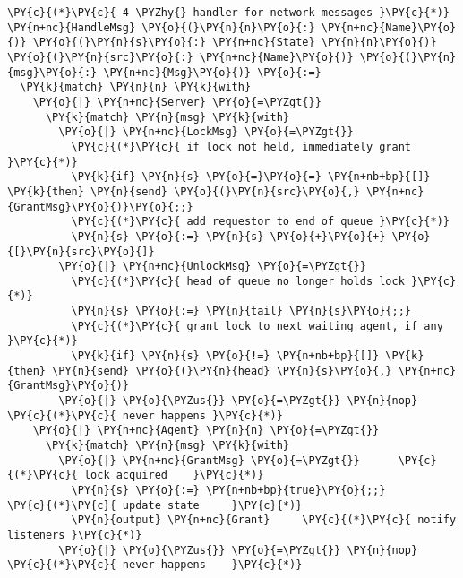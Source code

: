 \begin{Verbatim}[commandchars=\\\{\},codes={\catcode`\$=3\catcode`\^=7\catcode`\_=8}]
\PY{c}{(*}\PY{c}{ 4 \PYZhy{} handler for network messages }\PY{c}{*)}
\PY{n+nc}{HandleMsg} \PY{o}{(}\PY{n}{n}\PY{o}{:} \PY{n+nc}{Name}\PY{o}{)} \PY{o}{(}\PY{n}{s}\PY{o}{:} \PY{n+nc}{State} \PY{n}{n}\PY{o}{)} \PY{o}{(}\PY{n}{src}\PY{o}{:} \PY{n+nc}{Name}\PY{o}{)} \PY{o}{(}\PY{n}{msg}\PY{o}{:} \PY{n+nc}{Msg}\PY{o}{)} \PY{o}{:=}
  \PY{k}{match} \PY{n}{n} \PY{k}{with}
    \PY{o}{|} \PY{n+nc}{Server} \PY{o}{=\PYZgt{}}
      \PY{k}{match} \PY{n}{msg} \PY{k}{with}
        \PY{o}{|} \PY{n+nc}{LockMsg} \PY{o}{=\PYZgt{}}
          \PY{c}{(*}\PY{c}{ if lock not held, immediately grant }\PY{c}{*)}
          \PY{k}{if} \PY{n}{s} \PY{o}{=}\PY{o}{=} \PY{n+nb+bp}{[]} \PY{k}{then} \PY{n}{send} \PY{o}{(}\PY{n}{src}\PY{o}{,} \PY{n+nc}{GrantMsg}\PY{o}{)}\PY{o}{;;}
          \PY{c}{(*}\PY{c}{ add requestor to end of queue }\PY{c}{*)}
          \PY{n}{s} \PY{o}{:=} \PY{n}{s} \PY{o}{+}\PY{o}{+} \PY{o}{[}\PY{n}{src}\PY{o}{]}
        \PY{o}{|} \PY{n+nc}{UnlockMsg} \PY{o}{=\PYZgt{}}
          \PY{c}{(*}\PY{c}{ head of queue no longer holds lock }\PY{c}{*)}
          \PY{n}{s} \PY{o}{:=} \PY{n}{tail} \PY{n}{s}\PY{o}{;;}
          \PY{c}{(*}\PY{c}{ grant lock to next waiting agent, if any }\PY{c}{*)}
          \PY{k}{if} \PY{n}{s} \PY{o}{!=} \PY{n+nb+bp}{[]} \PY{k}{then} \PY{n}{send} \PY{o}{(}\PY{n}{head} \PY{n}{s}\PY{o}{,} \PY{n+nc}{GrantMsg}\PY{o}{)}
        \PY{o}{|} \PY{o}{\PYZus{}} \PY{o}{=\PYZgt{}} \PY{n}{nop} \PY{c}{(*}\PY{c}{ never happens }\PY{c}{*)}
    \PY{o}{|} \PY{n+nc}{Agent} \PY{n}{n} \PY{o}{=\PYZgt{}}
      \PY{k}{match} \PY{n}{msg} \PY{k}{with}
        \PY{o}{|} \PY{n+nc}{GrantMsg} \PY{o}{=\PYZgt{}}      \PY{c}{(*}\PY{c}{ lock acquired    }\PY{c}{*)}
          \PY{n}{s} \PY{o}{:=} \PY{n+nb+bp}{true}\PY{o}{;;}      \PY{c}{(*}\PY{c}{ update state     }\PY{c}{*)}
          \PY{n}{output} \PY{n+nc}{Grant}     \PY{c}{(*}\PY{c}{ notify listeners }\PY{c}{*)}
        \PY{o}{|} \PY{o}{\PYZus{}} \PY{o}{=\PYZgt{}} \PY{n}{nop}         \PY{c}{(*}\PY{c}{ never happens    }\PY{c}{*)}
\end{Verbatim}
